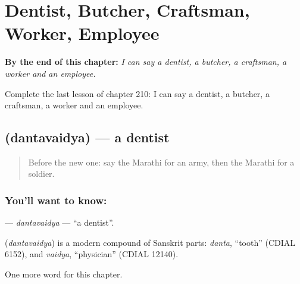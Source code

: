 
\chapter{Dentist, Butcher, Craftsman, Worker, Employee}
\label{ch:mr-dentist-butcher-craftsman-worker-employee}

\begin{chapteropening}
\textbf{By the end of this chapter:} \emph{I can say a dentist, a butcher, a craftsman, a worker and an employee.}

Complete the last lesson of chapter 210: I can say a dentist, a butcher, a craftsman, a worker and an employee.
\end{chapteropening}

\section[\texorpdfstring{\mr{दंतवैद्य} (dantavaidya)}{दंतवैद्य (dantavaidya)}]{ (dantavaidya) — a dentist}

\label{lesson:MR-C210-dantavaidya}



\begin{quote}
Before the new one: say the Marathi for an army, then the Marathi for a soldier.
\end{quote}

\subsection*{You'll want to know: }
\textbf{} — \emph{dantavaidya} — \textquotedblleft{}a dentist\textquotedblright{}.

\begin{cousinweb}
\textbf{} (\emph{dantavaidya}) is a modern compound of Sanskrit parts: \emph{danta}, \textquotedblleft{}tooth\textquotedblright{} (CDIAL 6152), and \emph{vaidya}, \textquotedblleft{}physician\textquotedblright{} (CDIAL 12140).
\end{cousinweb}

\begin{grammarlens}[title={What you've built}]
One more word for this chapter.
\end{grammarlens}

